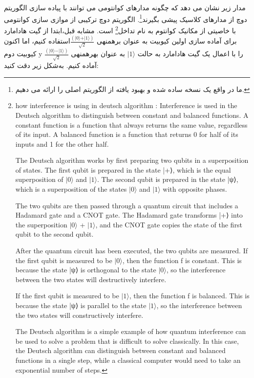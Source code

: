 \documentclass{book}
\begin{document}
مدار زیر نشان می دهد که چگونه مدارهای کوانتومی می توانند با پیاده سازی الگوریتم دوچ از مدارهای کلاسیک پیشی بگیرند\footnote{ما در واقع یک نسخه ساده شده و بهبود یافته از الگوریتم اصلی را ارائه می دهیم.}. الگوریتم دوچ ترکیبی از موازی سازی کوانتومی با خاصیتی از مکانیک کوانتوم به نام تداخل\footnote{how interference is using in deutsch algorithm : Interference is used in the Deutsch algorithm to distinguish between constant and balanced functions. A constant function is a function that always returns the same value, regardless of its input. A balanced function is a function that returns 0 for half of its inputs and 1 for the other half.
	
	The Deutsch algorithm works by first preparing two qubits in a superposition of states. The first qubit is prepared in the state |+⟩, which is the equal superposition of $\vert 0 \rangle$ and $\vert 1 \rangle$. The second qubit is prepared in the state |ψ⟩, which is a superposition of the states $\vert 0 \rangle$ and $\vert 1 \rangle$ with opposite phases.
	
	The two qubits are then passed through a quantum circuit that includes a Hadamard gate and a CNOT gate. The Hadamard gate transforms |+⟩ into the superposition $\vert 0 \rangle$ + $\vert 1 \rangle$, and the CNOT gate copies the state of the first qubit to the second qubit.
	
	After the quantum circuit has been executed, the two qubits are measured. If the first qubit is measured to be $\vert 0 \rangle$, then the function f is constant. This is because the state |ψ⟩ is orthogonal to the state $\vert 0 \rangle$, so the interference between the two states will destructively interfere.
	
	If the first qubit is measured to be $\vert 1 \rangle$, then the function f is balanced. This is because the state |ψ⟩ is parallel to the state $\vert 1 \rangle$, so the interference between the two states will constructively interfere.
	
	The Deutsch algorithm is a simple example of how quantum interference can be used to solve a problem that is difficult to solve classically. In this case, the Deutsch algorithm can distinguish between constant and balanced functions in a single step, while a classical computer would need to take an exponential number of steps.} است.
مشابه قبل،‌ابتدا از گیت هادامارد برای آماده سازی اولین کیوبیت به عنوان برهمنهی $\frac{(\vert 0 \rangle + \vert 1 \rangle)}{\sqrt{2}}$استفاده کنیم، اما اکنون کیوبیت دوم y را با اعمال یک گیت هادامارد به حالت $\vert 1 \rangle$ به عنوان بهرهمنهی $\frac{(\vert 0 \rangle - \vert 1 \rangle)}{\sqrt{2}}$ آماده کنیم. به‌شکل زیر دقت کنید:
\end{document}
